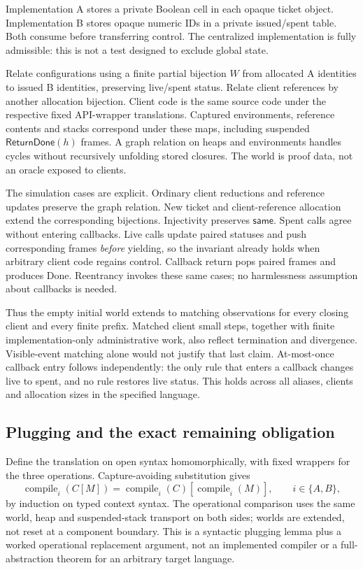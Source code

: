 \documentclass[11pt,a4paper]{article}
\begin{document}
Implementation A stores a private Boolean cell in each opaque ticket object.
Implementation B stores opaque numeric IDs in a private issued/spent table.
Both consume before transferring control. The centralized implementation is
fully admissible: this is not a test designed to exclude global state.

Relate configurations using a finite partial bijection \(W\) from allocated
A identities to issued B identities, preserving live/spent status. Relate client
references by another allocation bijection. Client code is the same source code
under the respective fixed API-wrapper translations. Captured environments,
reference contents and stacks correspond under these maps, including suspended
\(\mathsf{ReturnDone}(h)\) frames. A graph relation on heaps and environments
handles cycles without recursively unfolding stored closures. The world is
proof data, not an oracle exposed to clients.

The simulation cases are explicit. Ordinary client reductions and reference
updates preserve the graph relation. New ticket and client-reference allocation
extend the corresponding bijections. Injectivity preserves \(\mathsf{same}\).
Spent calls agree without entering callbacks. Live calls update paired statuses
and push corresponding frames \emph{before} yielding, so the invariant already
holds when arbitrary client code regains control. Callback return pops paired
frames and produces Done. Reentrancy invokes these same cases; no harmlessness
assumption about callbacks is needed.

Thus the empty initial world extends to matching observations for every closing
client and every finite prefix. Matched client small steps, together with finite
implementation-only administrative work, also reflect termination and divergence.
Visible-event matching alone would not justify that last claim. At-most-once
callback entry follows independently: the only rule that enters a callback
changes live to spent, and no rule restores live status. This holds across all
aliases, clients and allocation sizes in the specified language.

\subsection{Plugging and the exact remaining obligation}

Define the translation on open syntax homomorphically, with fixed wrappers for
the three operations. Capture-avoiding substitution gives
\[
 \operatorname{compile}_i(C[M])
 =\operatorname{compile}_i(C)[\operatorname{compile}_i(M)],
 \qquad i\in\{A,B\},
\]
by induction on typed context syntax. The operational comparison uses the same
world, heap and suspended-stack transport on both sides; worlds are extended,
not reset at a component boundary. This is a syntactic plugging lemma plus a
worked operational replacement argument, not an implemented compiler or a
full-abstraction theorem for an arbitrary target language.
\end{document}

